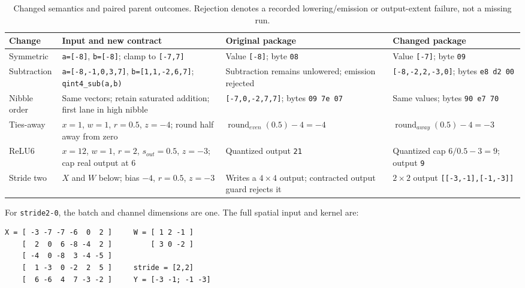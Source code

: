\begin{table}[!htbp]
  \centering\normalsize
  \caption{Changed semantics and paired parent outcomes. Rejection denotes a
  recorded lowering/emission or output-extent failure, not a missing run.}
  \label{tab:package-worked}
  \setlength{\tabcolsep}{5pt}
  \renewcommand{\arraystretch}{1.3}
  \begin{tabular}{@{}p{}p{}p{}p{}@{}}
    \toprule
    Change & Input and new contract & Original package & Changed package \\
    \midrule
    Symmetric & \texttt{a=[-8]}, \texttt{b=[-8]}; clamp to \texttt{[-7,7]} & Value \texttt{[-8]}; byte \texttt{08} & Value \texttt{[-7]}; byte \texttt{09} \\
    \addlinespace
    Subtraction & \texttt{a=[-8,-1,0,3,7]}, \texttt{b=[1,1,-2,6,7]}; \texttt{qint4\_sub(a,b)} & Subtraction remains unlowered; emission rejected & \texttt{[-8,-2,2,-3,0]}; bytes \texttt{e8 d2 00} \\
    \addlinespace
    Nibble order & Same vectors; retain saturated addition; first lane in high nibble & \texttt{[-7,0,-2,7,7]}; bytes \texttt{09 7e 07} & Same values; bytes \texttt{90 e7 70} \\
    \addlinespace
    Ties-away & $x=1$, $w=1$, $r=0.5$, $z=-4$; round half away from zero & $\operatorname{round}_{even}(0.5)-4=-4$ & $\operatorname{round}_{away}(0.5)-4=-3$ \\
    \addlinespace
    ReLU6 & $x=12$, $w=1$, $r=2$, $s_{out}=0.5$, $z=-3$; cap real output at 6 & Quantized output \texttt{21} & Quantized cap $6/0.5-3=9$; output \texttt{9} \\
    \addlinespace
    Stride two & $X$ and $W$ below; bias $-4$, $r=0.5$, $z=-3$ & Writes a $4\times4$ output; contracted output guard rejects it & $2\times2$ output \texttt{[[-3,-1],[-1,-3]]} \\
    \bottomrule
  \end{tabular}
\end{table}

For \texttt{stride2-0}, the batch and channel dimensions are one. The full
spatial input and kernel are:
\begin{verbatim}
X = [ -3 -7 -7 -6  0  2 ]     W = [ 1 2 -1 ]
    [  2  0  6 -8 -4  2 ]         [ 3 0 -2 ]
    [ -4  0 -8  3 -4 -5 ]
    [  1 -3  0 -2  2  5 ]     stride = [2,2]
    [  6 -6  4  7 -3 -2 ]     Y = [-3 -1; -1 -3]
\end{verbatim}
